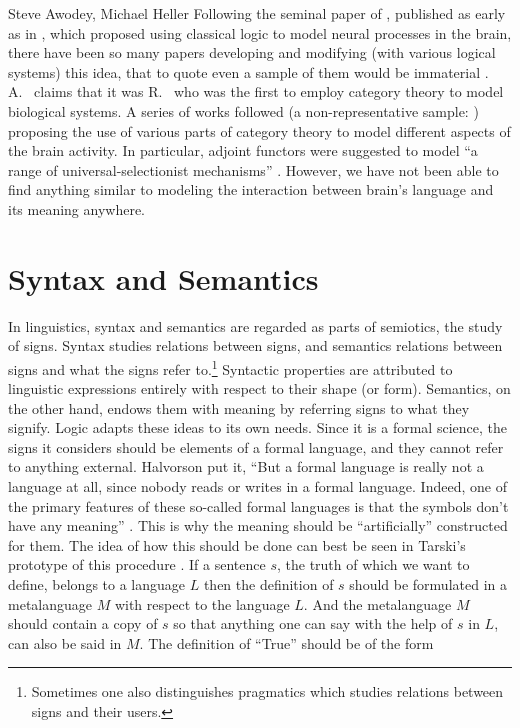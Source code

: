 \begin{artengenv2auth}{Steve Awodey, Michael Heller}
Following the seminal paper of %
\citeauthor{McCulloch}, published as early as in \cite*{McCulloch}, which proposed using classical logic to model neural processes in the brain, there have been so many papers developing and modifying (with various logical systems) this idea, that to quote even a sample of them would be immaterial \parencite[for a relatively recent state of art see a short review][]{Koch}. A.~\citeauthor{Ehresmann} claims that it was R.~\citeauthor{Rosen} who was the first to employ category theory to model biological systems. A series of works followed (a non-representative sample: \parencites{Gomez}{Healy}{Mizraji}{Naotsugu}) proposing  the use of various parts of category theory to model different aspects of the brain activity. In particular, adjoint functors were suggested to model ``a range of universal-selectionist mechanisms'' \parencite{Ellerman}. However, we have not been able to find anything similar to modeling the interaction between brain's language and its meaning anywhere.

\section{Syntax and Semantics}
In linguistics, syntax and semantics are regarded as parts of semiotics, the study of signs. Syntax studies relations between signs, and semantics relations between signs and what the signs refer to.\footnote{Sometimes one also distinguishes pragmatics which studies relations between signs and their users.} Syntactic properties are attributed to linguistic expressions entirely with respect to their shape (or form). Semantics, on the other hand, endows them with meaning by referring signs to what they signify. Logic adapts these ideas to its own needs. Since it is a formal science, the signs it considers should be elements of a formal language, and they cannot refer to anything external. Halvorson put it, ``But a formal language is really not a language at all, since nobody reads or writes in a formal language. Indeed, one of the primary features of these so-called formal languages is that the symbols don't have any meaning'' \parencite{Halvorson2016}. This is why the meaning should be ``artificially'' constructed for them. The idea of how this should be done can best be seen in Tarski's prototype of this procedure \parencite{Tarski}. If a sentence $s$, the truth of which we want to define, belongs to a language $L$ then the definition of $s$ should be formulated in a metalanguage $M$ with respect to the language $L$. And the metalanguage $M$ should contain a copy of $s$ so that anything one can say with the help of $s$ in $L$, can also be said in $M$. The definition of ``True'' should be of the form


\end{artengenv2auth}
